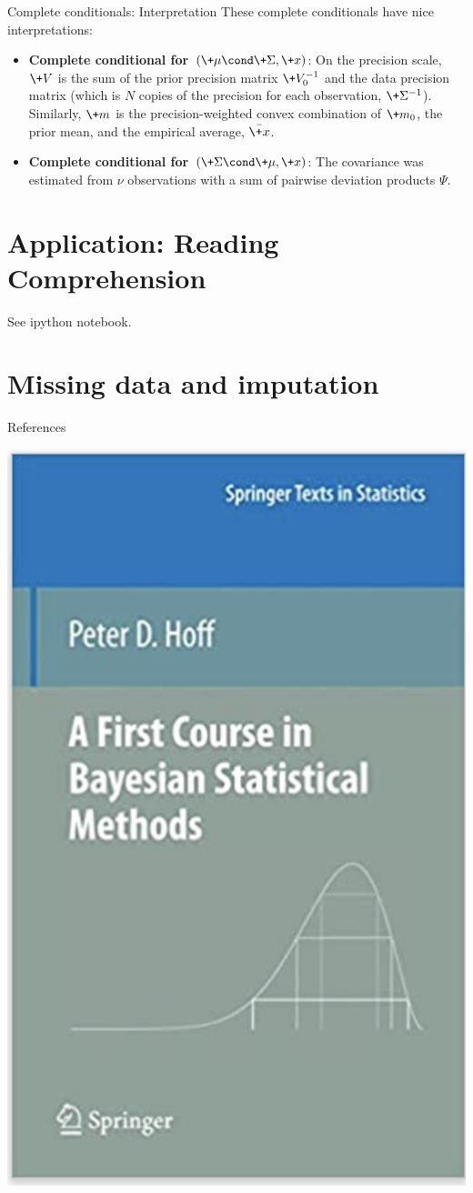\documentclass[10pt]{beamer}
\begin{document}
 
\begin{frame}{Complete conditionals: Interpretation}
These complete conditionals have nice interpretations:
\begin{itemize}
\item \textbf{Complete conditional for $(\+\mu  \cond \+\Sigma, \+x)$}: On the precision scale,  $\+V$ is the sum of the prior precision matrix $\+V_0^{-1}$ and the data precision matrix (which is $N$ copies of the precision for each observation,  $\+\Sigma^{-1}$).    Similarly,  $\+m$ is the precision-weighted convex combination of $\+m_0$, the prior mean,    and the empirical average, $\bar{\+x}$.
\item \textbf{Complete conditional for $(\+\Sigma \cond \+\mu,  \+x)$}:  The covariance was estimated from $\nu$ observations with a sum of pairwise deviation products $\Psi$.
\end{itemize}
\end{frame}


	
	

\section{Application: Reading Comprehension}

\begin{frame}

See ipython notebook. 	
\end{frame}


\section{Missing data and imputation}

\begin{frame}{References}

\begin{center}
\includegraphics[width=.5\textwidth]{images/hoff_book}
\end{center}

\end{frame}
\end{document}
